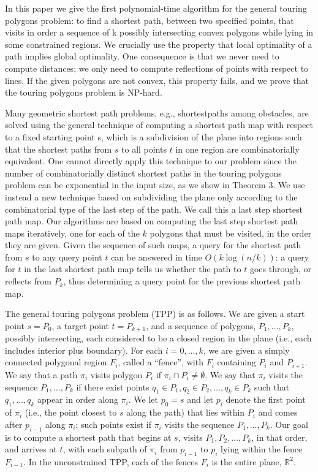 \documentclass[a4paper]{article}
\begin{document}
In this paper we give the first polynomial-time algorithm for the general touring polygons problem: to find a shortest path, between two specified points, that visits in order a sequence of k possibly intersecting convex polygons while lying in some constrained regions. We crucially use the property that local optimality of a path implies global optimality. One consequence is that we never need to compute distances; we only need to compute reflections of points with respect to lines. If the given polygons are not convex, this property fails, and we prove that the touring polygons problem
is NP-hard.

Many geometric shortest path problems, e.g., shortestpaths among obstacles, are solved using the general technique of computing a shortest path map with respect to a fixed starting point s, which is a subdivision of the plane into regions such that the shortest paths from \(s\) to all points \(t\) in one region are combinatorially equivalent. One cannot directly apply this technique to our problem since the number of combinatorially distinct shortest paths in the touring polygons problem can be exponential in the input size, as we show in Theorem 3. We use instead a new technique based on subdividing the plane only according to the combinatorial type of the last step of the path. We call this a last step shortest path map. Our algorithms are based on computing the last step shortest path maps iteratively, one for each of the \(k\) polygons that must be visited, in the order they are given. Given the sequence of such maps, a query for the shortest path from \(s\) to any query point \(t\) can be answered in time \(O(k \log(n / k))\): a query for \(t\) in the last shortest path map tells us whether the path to \(t\) goes through, or reflects from \(P_k\), thus determining a query point for the previous shortest path map.

The general touring polygons problem (TPP) is as follows. We are given a start point \(s = P_0\), a target point \(t = P_{k + 1}\), and a sequence of polygons, \(P_1, \dots , P_k\), possibly intersecting, each considered to be a closed region in the plane (i.e., each includes interior plus boundary). For each \(i = 0, \dots , k\), we are given a simply connected polygonal region \(F_i\), called a “fence”, with \(F_i\) containing \(P_i\) and \(P_{i+1}\). We say that a path \(\pi_i\) visits polygon \(P_i\) if \(\pi_i \cap P_i \ne \emptyset\). We say that \(\pi_i\) visits the sequence \(P_1, \dots , P_k\) if there exist points \(q_1 \in P_1, q_2 \in P_2, \dots, q_k \in P_k\) such that \(q_1, \dots, q_k\) appear in order along \(\pi_i\). We let \(p_0 = s\) and let \(p_i\) denote the first point of \(\pi_i\) (i.e., the point closest to \(s\) along the path) that lies within \(P_i\) and comes after \(p_{i - 1}\) along \(\pi_i\); such points exist if \(\pi_i\) visits the sequence \(P_1, \dots, P_k\). Our goal is to compute a shortest path that begins at \(s\), visits \(P_1, P_2, \dots, P_k\), in that order, and arrives at \(t\), with each subpath of \(\pi_i\) from \(p_{i - 1}\) to \(p_i\) lying within the fence \(F_{i - 1}\). In the unconstrained TPP, each of the fences \(F_i\) is the entire plane, \(\mathbb{R} ^ 2\).
\end{document}
